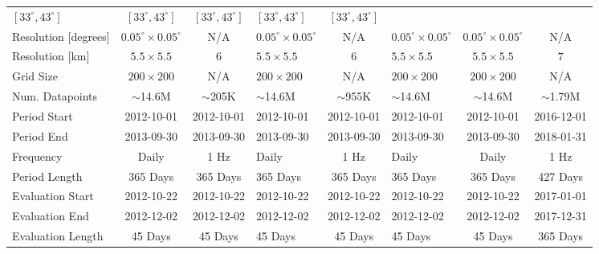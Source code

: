 \begin{landscape}
\begin{table}[ht]
\begin{tabular}{lcclclcc}
$[33^\circ, 43^\circ]$ &
$[33^\circ, 43^\circ]$ &
$[33^\circ, 43^\circ]$ &
$[33^\circ, 43^\circ]$ &
$[33^\circ, 43^\circ]$ \\
Resolution [degrees] &
$0.05^\circ\times 0.05^\circ$ &
N/A &
$0.05^\circ\times 0.05^\circ$ &
N/A &
$0.05^\circ\times 0.05^\circ$ &
$0.05^\circ\times 0.05^\circ$ &
N/A \\
Resolution [km] &
$5.5\times 5.5$ &
$6$ &
$5.5\times 5.5$ &
$6$ &
$5.5\times 5.5$ &
$5.5\times 5.5$ &
$7$ \\
Grid Size &
$200\times 200$ & 
N/A &
$200\times 200$ & 
N/A &
$200\times 200$ & 
$200\times 200$ & 
N/A \\
Num. Datapoints &
$\sim$14.6M & 
$\sim$205K & 
$\sim$14.6M & 
$\sim$955K & 
$\sim$14.6M & 
$\sim$14.6M & 
$\sim$1.79M \\ \midrule
Period Start & 
2012-10-01 & 2012-10-01 & 2012-10-01 & 2012-10-01 & 
2012-10-01 & 2012-10-01 & 2016-12-01 \\
Period End & 
2013-09-30 & 2013-09-30 & 2013-09-30 & 2013-09-30 & 
2013-09-30 & 2013-09-30 & 2018-01-31 \\
Frequency  & 
Daily & 1 Hz  & Daily & 1 Hz  & Daily & Daily & 1 Hz \\ 
Period Length & 365 Days & 365 Days & 365 Days &
365 Days & 365 Days & 365 Days & 427 Days \\
\midrule
Evaluation Start & 
2012-10-22 & 2012-10-22 & 2012-10-22 & 2012-10-22 & 
2012-10-22 & 2012-10-22 & 2017-01-01 \\
Evaluation End & 
2012-12-02 & 2012-12-02 & 2012-12-02 & 2012-12-02 & 
2012-12-02 & 2012-12-02 & 2017-12-31 \\ 
Evaluation Length & 45 Days & 45 Days & 45 Days &
45 Days & 45 Days & 45 Days & 365 Days \\
\bottomrule
\end{tabular}
\end{table}
\end{landscape}